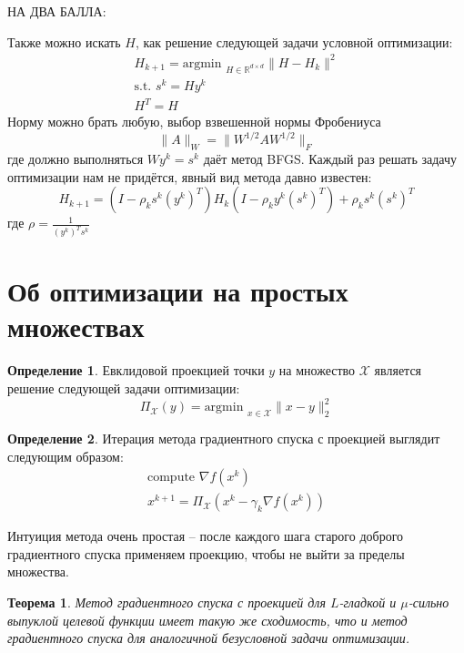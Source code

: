 \documentclass[a4paper,12pt]{article}
\theoremstyle{plain}
\newtheorem{theorem}{Теорема}[section]
\theoremstyle{definition}
\newtheorem{definition}{Определение}[section]
\theoremstyle{remark}
\begin{document}
НА ДВА БАЛЛА:

Также можно искать $H$, как решение следующей задачи условной оптимизации:
\begin{align*}
	H_{k  + 1} = \text{argmin }_{H \in \mathbb{R}^{d \times d}}\|H - H_k\|^2 \\
	\text{s.t. } s^k = Hy^k                                                  \\
	H^T = H
\end{align*}
Норму можно брать любую, выбор взвешенной нормы Фробениуса
\[
	\|A\|_W = \|W^{1/2}AW^{1/2}\|_F
\]
где должно выполняться $Wy^k = s^k$ даёт метод BFGS. Каждый раз решать задачу оптимизации нам не придётся, явный вид метода давно известен:
\[
	H_{k + 1} = (I - \rho_ks^k(y^k)^T)H_k(I - \rho_ky^k(s^k)^T) + \rho_ks^k(s^k)^T
\]
где $\rho = \frac{1}{(y^k)^Ts^k}$

\section{Об оптимизации на простых множествах}
\begin{definition}
	Евклидовой проекцией точки $y$ на множество $\mathcal{X}$ является решение следующей задачи оптимизации:
	\[
		\Pi_\mathcal{X}(y) = \text{argmin }_{x \in \mathcal{X}}\|x - y\|_2^2
	\]
\end{definition}

\begin{definition}
	Итерация метода градиентного спуска с проекцией выглядит следующим образом:
	\begin{align*}
		\text{compute }\nabla f(x^k) \\
		x^{k + 1} = \Pi_\mathcal{X}(x^k - \gamma_k\nabla f(x^k))
	\end{align*}
\end{definition}

Интуиция метода очень простая -- после каждого шага старого доброго градиентного спуска применяем проекцию, чтобы не выйти за пределы множества.

\begin{theorem}
	Метод градиентного спуска с проекцией для $L$-гладкой и $\mu$-сильно выпуклой целевой функции имеет такую же сходимость, что и метод градиентного спуска для аналогичной безусловной задачи оптимизации.
\end{theorem}
\end{document}
